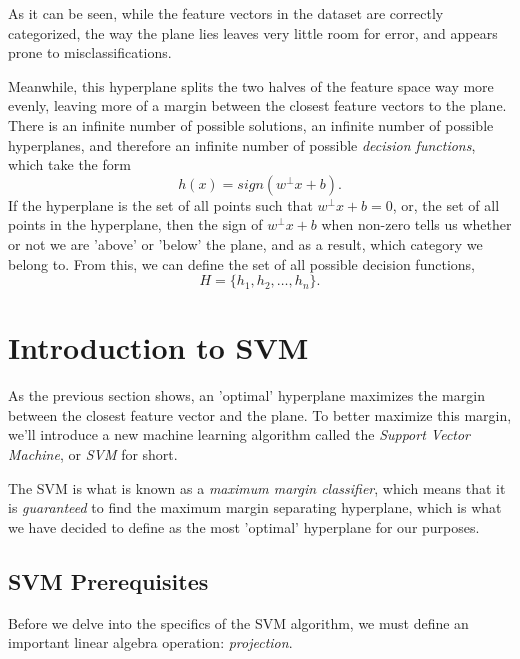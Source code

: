 As it can be seen, while the feature vectors in the dataset are correctly categorized, the way the plane lies leaves very little room for error, and appears prone to misclassifications.


Meanwhile, this hyperplane splits the two halves of the feature space way more evenly, leaving more of a margin between the closest feature vectors to the plane. There is an infinite number of possible solutions, an infinite number of possible hyperplanes, and therefore an infinite number of possible \textit{decision functions}, which take the form
\[
    h(x) = sign(w^\perp x+b).
\]
If the hyperplane is the set of all points such that $w^\perp x+b=0$, or, the set of all points in the hyperplane, then the sign of $w^\perp x+b$ when non-zero tells us whether or not we are 'above' or 'below' the plane, and as a result, which category we belong to. From this, we can define the set of all possible decision functions,
\[
    H = \{h_1, h_2, \dots, h_n\}.
\]

\section{Introduction to SVM}
As the previous section shows, an 'optimal' hyperplane maximizes the margin between the closest feature vector and the plane. To better maximize this margin, we'll introduce a new machine learning algorithm called the \textit{Support Vector Machine}, or \textit{SVM} for short.

The SVM is what is known as a \textit{maximum margin classifier}, which means that it is \textit{guaranteed} to find the maximum margin separating hyperplane, which is what we have decided to define as the most 'optimal' hyperplane for our purposes.

\subsection{SVM Prerequisites}
Before we delve into the specifics of the SVM algorithm, we must define an important linear algebra operation: \textit{projection}.

